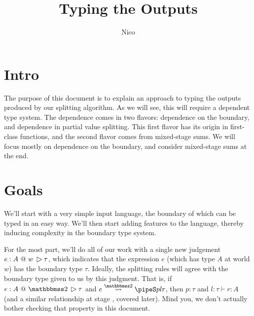 \documentclass[]{article}
\title{Typing the Outputs}
\author{Nico}
\begin{document}
\maketitle

\begin{abstrsyn}

\newcommand {\ibksym} {\rotatebox[origin=c]{270}{$\therefore$}}
\newcommand {\btsym} {\rotatebox[origin=c]{270}{$\triangle$}}
\newcommand {\ktype} {\rm Type}
\newcommand {\ibk} [2] {{#1}~\ibksym~{#2}}
\newcommand {\btj} [4] {{#1}:{#2}~@~{#3}~\btsym~{#4}}
\newcommand {\btyo} [4] [\Gamma] {{#1}\vdash \btj{#2}{#3}\bbone{#4}}
\newcommand {\btyt} [4] [\Gamma] {{#1}\vdash \btj{#2}{#3}\bbtwo{#4}}
\newcommand {\btyw} [4] [\Gamma] {{#1}\vdash \btj{#2}{#3}w{#4}}
\newcommand {\btysub} [2] [] {\bty{e_{#1}:{#2}}{\tau_{#1}}{\sigma_{#1}}}

\section {Intro}

The purpose of this document is to explain an approach to typing the outputs produced by our splitting algorithm.
As we will see, this will require a dependent type system.
The dependence comes in two flavors: dependence on the boundary, and dependence in partial value splitting.
This first flavor has its origin in first-class functions, and the second flavor comes from mixed-stage sums.
We will focus mostly on dependence on the boundary, and consider mixed-stage sums at the end.

\section{Goals}

We'll start with a very simple input language, the boundary of which can be typed in an easy way.
We'll then start adding features to the language, thereby inducing complexity in the boundary type system.

For the most part, we'll do all of our work with a single new judgement $\btj e A w \tau$, 
which indicates that the expression $e$ (which has type $A$ at world $w$) has the boundary type $\tau$.
Ideally, the splitting rules will agree with the boundary type given to us by this judgment.
That is, if $\btj e A \bbtwo \tau $ and $\splittwo{e}{A}{p}{l}{r}$, 
then $p:\tau$ and $l:\tau \vdash r:A$ (and a similar relationship at stage \bbone, covered later).
Mind you, we don't actually bother checking that property in this document.


\end{abstrsyn}
\end{document}
